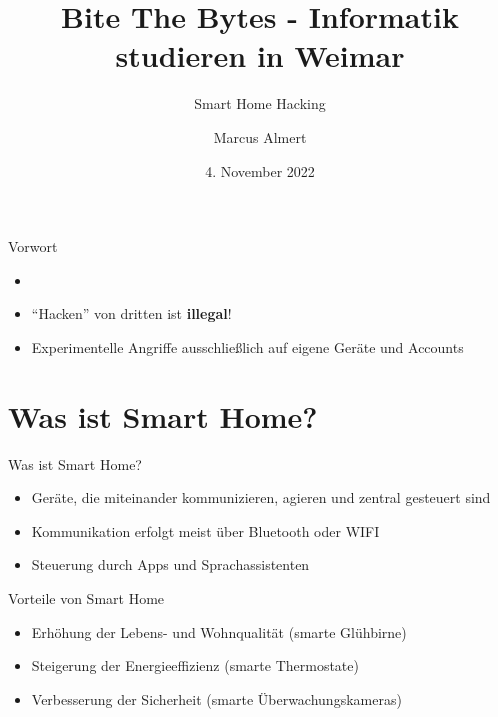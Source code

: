 \documentclass[11pt, aspectratio=169, modernfonts]{beamer}
\title[Smart Home Hacking]{Bite The Bytes - Informatik studieren in Weimar}
\subtitle{\Large{Smart Home Hacking}}
\author[M. Almert]{Marcus Almert}
\institute[Bauhaus-Universität Weimar]{Bauhaus-Universität Weimar\\[0.5cm] Fakultät Medien}
\date{4. November 2022}
\begin{document}

    \maketitle


    \begin{frame}{Vorwort}
        \begin{itemize}
            \item
            \item \enquote{Hacken} von dritten ist \textbf{illegal}!
            \item Experimentelle Angriffe ausschließlich auf eigene Geräte und Accounts
        \end{itemize}
    \end{frame}


    \section{Was ist Smart Home?}\label{sec:was-ist-smart-home?}

    \begin{frame}{Was ist Smart Home?}
        \begin{itemize}
            \item Geräte, die miteinander kommunizieren, agieren und zentral gesteuert sind\\[.4cm]
            \item Kommunikation erfolgt meist über Bluetooth oder WIFI\\[.4cm]
            \item Steuerung durch Apps und Sprachassistenten\\[.4cm]
        \end{itemize}
    \end{frame}

    \begin{frame}{Vorteile von Smart Home}
        \begin{itemize}
            \item Erhöhung der Lebens- und Wohnqualität (smarte Glühbirne)\\[.4cm]
            \item Steigerung der Energieeffizienz (smarte Thermostate)\\[.4cm]
            \item Verbesserung der Sicherheit (smarte Überwachungskameras)\\[.4cm]
        \end{itemize}
    \end{frame}
\end{document}
